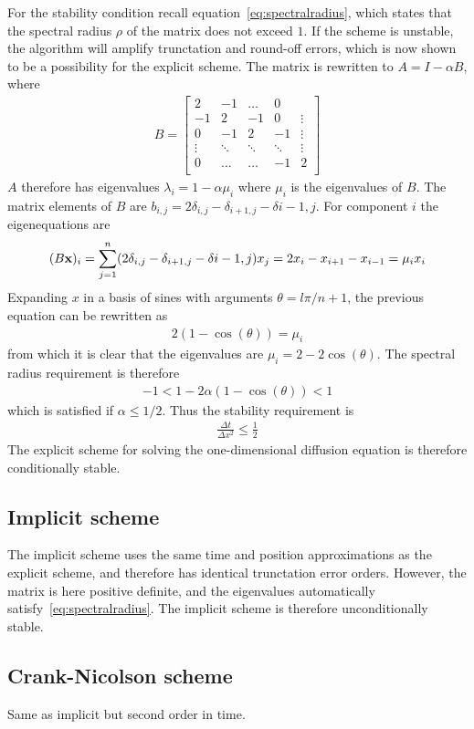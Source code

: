\documentclass[aps,reprint]{revtex4-1}
\newcommand\blankpage{%
  \null
  \thispagestyle{empty}%
  \addtocounter{page}{-1}%
  \newpage}
\begin{document}
For the stability condition recall equation~\ref{eq:spectralradius}, which states
that the spectral radius $\rho$ of the matrix does not exceed $1$. If the scheme is
unstable, the algorithm will amplify trunctation and round-off errors, which is
now shown to be a possibility for the explicit scheme. The matrix
is rewritten to $A = I - \alpha B$, where
\begin{align*}
  B = \begin{bmatrix}
        2  & -1 & \hdots  & 0      \\
        -1 & 2  & -1 & 0       & \vdots \\
        0  & -1 & 2  & -1  & \vdots \\
        \vdots       & \ddots      & \ddots       & \ddots  & \vdots \\
        0  & \hdots  & \hdots       & -1  & 2 \\
      \end{bmatrix}
\end{align*}
$A$ therefore has eigenvalues $\lambda_i = 1 - \alpha \mu_i$ where $\mu_i$ is
the eigenvalues of $B$. The matrix elements of $B$ are $b_{i,j} = 2\delta_{i,j} - \delta_{i+1,j} - \delta{i-1,j}$.
For component $i$ the eigenequations are
\begin{align*}
  (B\vb{x})_i = \sum_{j=1}^{n} (2\delta_{i,j} - \delta_{i+1,j} - \delta{i-1,j})x_j = 2x_i - x_{i+1} - x_{i-1} = \mu_i x_i
\end{align*}
Expanding $x$ in a basis of sines with arguments $\theta = l \pi / n + 1$, the previous equation can be rewritten as
\begin{align*}
  2(1 - \cos{(\theta)}) = \mu_i
\end{align*}
from which it is clear that the eigenvalues are $\mu_i = 2 - 2 \cos{(\theta)}$. The
spectral radius requirement is therefore
\begin{align*}
  -1 < 1 - 2 \alpha (1 - \cos{(\theta)}) < 1
\end{align*}
which is satisfied if $\alpha \leq 1/2$. Thus the stability requirement is
\begin{align}
  \frac{\Delta{t}}{\Delta{x^2}} \leq \frac{1}{2}
\end{align}
The explicit scheme for solving the one-dimensional diffusion equation is therefore
conditionally stable.

\subsection{Implicit scheme}
The implicit scheme uses the same time and position approximations as the explicit
scheme, and therefore has identical trunctation error orders. However, the matrix
is here positive definite, and the eigenvalues automatically satisfy~\ref{eq:spectralradius}.
The implicit scheme is therefore unconditionally stable.

\subsection{Crank-Nicolson scheme}
Same as implicit but second order in time.
\blankpage
\end{document}
